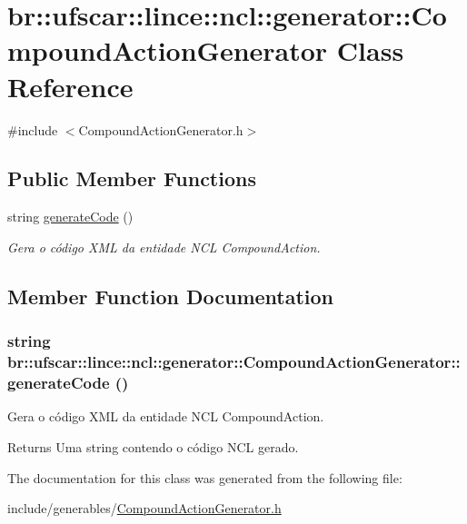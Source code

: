 \hypertarget{classbr_1_1ufscar_1_1lince_1_1ncl_1_1generator_1_1CompoundActionGenerator}{
\section{br::ufscar::lince::ncl::generator::CompoundActionGenerator Class Reference}
\label{classbr_1_1ufscar_1_1lince_1_1ncl_1_1generator_1_1CompoundActionGenerator}
}


{\ttfamily \#include $<$CompoundActionGenerator.h$>$}

\subsection*{Public Member Functions}
\begin{DoxyCompactItemize}
\item 
string \hyperlink{classbr_1_1ufscar_1_1lince_1_1ncl_1_1generator_1_1CompoundActionGenerator_a967fae39919459dce71908496c1553c9}{generateCode} ()
\begin{DoxyCompactList}\small\item\em Gera o código XML da entidade NCL CompoundAction. \item\end{DoxyCompactList}\end{DoxyCompactItemize}


\subsection{Member Function Documentation}
\hypertarget{classbr_1_1ufscar_1_1lince_1_1ncl_1_1generator_1_1CompoundActionGenerator_a967fae39919459dce71908496c1553c9}{
\subsubsection[{generateCode}]{\setlength{\rightskip}{0pt plus 5cm}string br::ufscar::lince::ncl::generator::CompoundActionGenerator::generateCode ()}}
\label{classbr_1_1ufscar_1_1lince_1_1ncl_1_1generator_1_1CompoundActionGenerator_a967fae39919459dce71908496c1553c9}


Gera o código XML da entidade NCL CompoundAction. 

\begin{DoxyReturn}{Returns}
Uma string contendo o código NCL gerado. 
\end{DoxyReturn}


The documentation for this class was generated from the following file:\begin{DoxyCompactItemize}
\item 
include/generables/\hyperlink{CompoundActionGenerator_8h}{CompoundActionGenerator.h}\end{DoxyCompactItemize}
